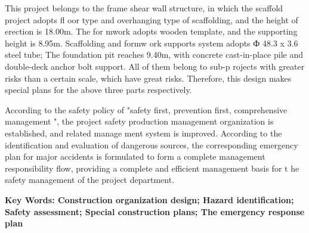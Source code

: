    This project belongs to the frame shear wall structure, in which the scaffold project adopts fl oor type and overhanging type of scaffolding, 
   and the height of erection is 18.00m. The for mwork adopts wooden template, and the supporting height is 8.95m. Scaffolding and formw ork 
   supports system adopts Ф 48.3 x 3.6 steel tube; The foundation pit reaches 9.40m, with concrete cast-in-place pile and double-deck anchor 
   bolt support. All of them belong to sub-p rojects with greater risks than a certain scale, which have great risks. Therefore, this design 
   makes special plans for the above three parts respectively.

   According to the safety policy of "safety first, prevention first, comprehensive management ", the project safety production management 
   organization is established, and related manage ment system is improved. According to the identification and evaluation of dangerous sources,
    the corresponding emergency plan for major accidents is formulated to form a complete management responsibility flow, providing a complete 
    and efficient management basis for t he safety management of the project department.


\textbf{ Key Words: Construction organization design; Hazard identification; Safety assessment; Special construction plans; The emergency response plan}
\pagestyle{fancy}



